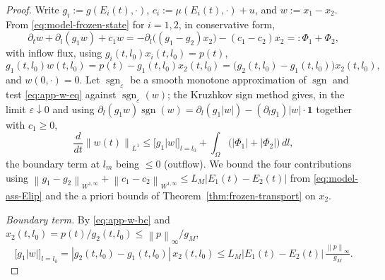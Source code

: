 \documentclass[pdflatex,sn-mathphys-num]{sn-jnl}
\theoremstyle{thmstyleone}
\theoremstyle{definition}
\theoremstyle{remark}
\newcommand{\Om}{\Omega}
\newcommand{\norm}[1]{\left\lVert#1\right\rVert}
\newcommand{\abs}[1]{\left\lvert#1\right\rvert}
\numberwithin{equation}{section}
\begin{document}
\begin{proof}
Write $g_i:=g(E_i(t),\cdot)$, $c_i:=\mu(E_i(t),\cdot)+u$, and $w:=x_1-x_2$. From
\eqref{eq:model-frozen-state} for $i=1,2$, in conservative form,
\begin{equation}
\label{eq:app-w-eq}
\partial_t w+\partial_l(g_1 w)+c_1 w
=
-\partial_l\big((g_1-g_2)x_2\big)-(c_1-c_2)x_2
=:\Phi_1+\Phi_2,
\end{equation}
with inflow flux, using $g_i(t,l_0)x_i(t,l_0)=p(t)$,
\begin{equation}
\label{eq:app-w-bc}
g_1(t,l_0)w(t,l_0)
=p(t)-g_1(t,l_0)x_2(t,l_0)
=\big(g_2(t,l_0)-g_1(t,l_0)\big)x_2(t,l_0),
\end{equation}
and $w(0,\cdot)=0$. Let $\operatorname{sgn}_\varepsilon$ be a smooth monotone
approximation of $\operatorname{sgn}$ and test \eqref{eq:app-w-eq} against
$\operatorname{sgn}_\varepsilon(w)$; the Kruzhkov sign method gives, in the limit
$\varepsilon\downarrow0$ and using $\partial_l(g_1w)\operatorname{sgn}(w)
=\partial_l(g_1\abs{w})-(\partial_l g_1)\abs{w}\cdot\mathbf 1$ together with
$c_1\ge0$,
\begin{equation}
\label{eq:app-w-diff}
\frac{d}{dt}\norm{w(t)}_{L^1}
\le
\big[g_1\abs{w}\big]_{l=l_0}
+\int_\Om\big(\abs{\Phi_1}+\abs{\Phi_2}\big)\,dl ,
\end{equation}
the boundary term at $l_m$ being $\le0$ (outflow). We bound the four
contributions using $\norm{g_1-g_2}_{W^{1,\infty}}+\norm{c_1-c_2}_{W^{1,\infty}}
\le L_M\abs{E_1(t)-E_2(t)}$ from \eqref{eq:model-ass-Elip} and the a priori bounds
of Theorem~\ref{thm:frozen-transport} on $x_2$.

\emph{Boundary term.} By \eqref{eq:app-w-bc} and $x_2(t,l_0)=p(t)/g_2(t,l_0)\le
\norm{p}_\infty/g_M$,
\[
\big[g_1\abs{w}\big]_{l=l_0}
=\abs{g_2(t,l_0)-g_1(t,l_0)}\,x_2(t,l_0)
\le L_M\abs{E_1(t)-E_2(t)}\,\tfrac{\norm{p}_\infty}{g_M}.
\]


\end{proof}
\end{document}
